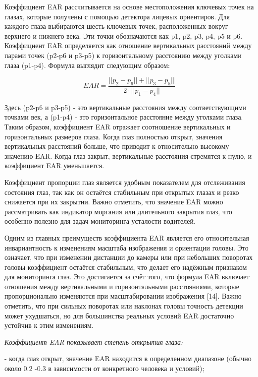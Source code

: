 \begin{multicols}{2}
Коэффициент EAR рассчитывается на основе местоположения ключевых точек
на глазах, которые получены с помощью детектора лицевых ориентиров. Для
каждого глаза выбираются шесть ключевых точек, расположенных вокруг
верхнего и нижнего века. Эти точки обозначаются как p1, p2, p3, p4, p5 и
p6. Коэффициент EAR определяется как отношение вертикальных расстояний
между парами точек (p2-p6 и p3-p5) к горизонтальному расстоянию между
уголками глаза (p1-p4). Формула выглядит следующим образом:

\begin{equation}
  EAR=\frac{||p_2-p_6||+||p_3-p_5||}{2\cdot ||p_1-p_4||}
\end{equation}

Здесь (p2-p6 и p3-p5) - это вертикальные расстояния между
соответствующими точками век, а (p1-p4) - это горизонтальное расстояние
между уголками глаза. Таким образом, коэффициент EAR отражает
соотношение вертикальных и горизонтальных размеров глаза. Когда глаз
полностью открыт, значения вертикальных расстояний больше, что приводит
к относительно высокому значению EAR. Когда глаз закрыт, вертикальные
расстояния стремятся к нулю, и коэффициент EAR уменьшается.

Коэффициент пропорции глаз является удобным показателем для отслеживания
состояния глаз, так как он остаётся стабильным при открытых глазах и
резко снижается при их закрытии. Важно отметить, что значение EAR можно
рассматривать как индикатор моргания или длительного закрытия глаз, что
особенно полезно для задач мониторинга усталости водителей.

Одним из главных преимуществ коэффициента EAR является его относительная
инвариантность к изменениям масштаба изображения и ориентации головы.
Это означает, что при изменении дистанции до камеры или при небольших
поворотах головы коэффициент остаётся стабильным, что делает его
надёжным признаком для мониторинга глаз. Это достигается за счёт того,
что формула EAR включает отношения между вертикальными и горизонтальными
расстояниями, которые пропорционально изменяются при масштабировании
изображения {[}14{]}. Важно отметить, что при сильных поворотах или
наклонах головы точность детекции может ухудшаться, но для большинства
реальных условий EAR достаточно устойчив к этим изменениям.

\emph{Коэффициент EAR показывает степень открытия глаза:}

- когда глаз открыт, значение EAR находится в определенном диапазоне
(обычно около 0.2 -0.3 в зависимости от конкретного человека и условий);


\end{multicols}
